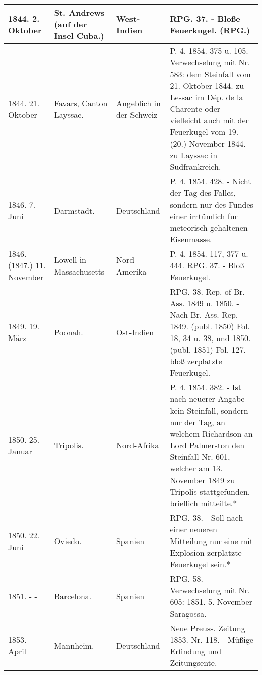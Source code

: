 \documentclass[a4paper, 11pt, oneside, polutonikogreek, german]{article}
\begin{document}
\begin{table}[!ht]
\begin{tabular}{|l|l|l|l|}
        1844. 2. Oktober & St. Andrews (auf der Insel Cuba.) & West-Indien & RPG. 37. - Bloße Feuerkugel. (RPG.) \\ \hline
        1844. 21. Oktober & Favars, Canton Layssac. & Angeblich in der Schweiz & P. 4. 1854. 375 u. 105. - Verwechselung mit Nr. 583: dem Steinfall vom 21. Oktober 1844. zu Lessac im Dép. de la Charente oder vielleicht auch mit der Feuerkugel vom 19. (20.) November 1844. zu Layssac in Sudfrankreich. \\ \hline
        1846. 7. Juni & Darmstadt. & Deutschland & P. 4. 1854. 428. - Nicht der Tag des Falles, sondern nur des Fundes einer irrtümlich fur meteorisch gehaltenen Eisenmasse. \\ \hline
        1846. (1847.) 11. November & Lowell in Massachusetts & Nord-Amerika & P. 4. 1854. 117, 377 u. 444. RPG. 37. - Bloß Feuerkugel. \\ \hline
        1849. 19. März & Poonah. & Ost-Indien & RPG. 38. Rep. of Br. Ass. 1849 u. 1850. - Nach Br. Ass. Rep. 1849. (publ. 1850) Fol. 18, 34 u. 38, und 1850. (publ. 1851) Fol. 127. bloß zerplatzte Feuerkugel. \\ \hline
        1850. 25. Januar & Tripolis. & Nord-Afrika & P. 4. 1854. 382. - Ist nach neuerer Angabe kein Steinfall, sondern nur der Tag, an welchem Richardson an Lord Palmerston den Steinfall Nr. 601, welcher am 13. November 1849 zu Tripolis stattgefunden, brieflich mitteilte.* \\ \hline
        1850. 22. Juni & Oviedo. & Spanien & RPG. 38. - Soll nach einer neueren Mitteilung nur eine mit Explosion zerplatzte Feuerkugel sein.* \\ \hline
        1851. - - & Barcelona. & Spanien & RPG. 58. - Verwechselung mit Nr. 605: 1851. 5. November Saragossa. \\ \hline
        1853. - April & Mannheim. & Deutschland & Neue Preuss. Zeitung 1853. Nr. 118. - Müßige Erfindung und Zeitungsente. \\ \hline
    \end{tabular}
\end{table}
\clearpage
\end{document}
